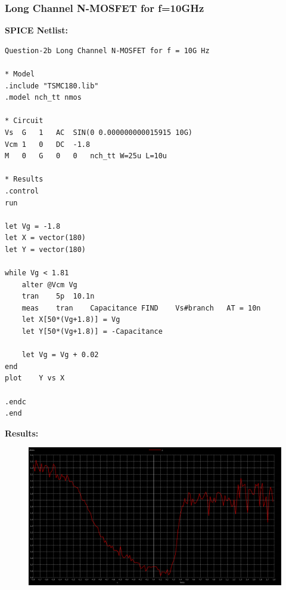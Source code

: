 \documentclass{article}
\begin{document}
\subsubsection{Long Channel N-MOSFET for f=10GHz}
\textbf{SPICE Netlist:}
\begin{lstlisting}
Question-2b Long Channel N-MOSFET for f = 10G Hz

* Model
.include "TSMC180.lib"
.model nch_tt nmos

* Circuit
Vs	G	1	AC	SIN(0 0.000000000015915 10G)
Vcm	1	0	DC	-1.8
M	0	G	0	0	nch_tt W=25u L=10u

* Results
.control
run

let Vg = -1.8
let X = vector(180)
let Y = vector(180)

while Vg < 1.81
	alter @Vcm Vg
	tran	5p	10.1n		
	meas	tran	Capacitance	FIND	Vs#branch	AT = 10n
	let X[50*(Vg+1.8)] = Vg
	let Y[50*(Vg+1.8)] = -Capacitance

	let Vg = Vg + 0.02
end
plot	Y vs X

.endc
.end
\end{lstlisting}
\textbf{Results:}
\begin{figure}[!ht]
    \centering
    \includegraphics[scale=0.25]{Images/2blong2.png}
\end{figure}
\end{document}
